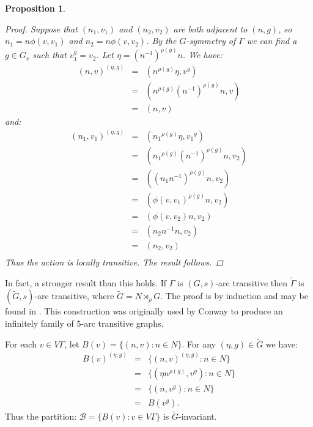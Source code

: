 \documentclass[12pt]{amsart}
\theoremstyle{plain}
\newtheorem{proposition}{Proposition}
\theoremstyle{definition}
\theoremstyle{remark}
\newcommand{\cB}{\mathcal{B}}
\begin{document}
\begin{proposition}
\begin{proof}
\hfill \break
Suppose that $(n_1,v_1)$ and $(n_2,v_2)$ are both adjacent to $(n,g)$,
so $n_1 = n \phi(v,v_1)$ and $n_2 = n \phi(v,v_2)$.
By the $G$-symmetry of $\Gamma$ we can find a $g \in G_v$ such that
$v_1^g = v_2$.
Let $\eta = (n^{-1})^{\rho(g)}n$. We have:
\begin{eqnarray*}
(n,v)^{(\eta,g)} & = & (n^{\rho(g)} \eta, v^g) \\
                 & = & (n^{\rho(g)} (n^{-1})^{\rho(g)}n, v) \\
		 & = & (n,v)
\end{eqnarray*}
and:
\begin{eqnarray*}
(n_1,v_1)^{(\eta,g)} & = & ({n_1}^{\rho(g)} \eta, {v_1}^g) \\
                 & = & ({n_1}^{\rho(g)} (n^{-1})^{\rho(g)}n, v_2) \\
                 & = & ({(n_1 n^{-1})}^{\rho(g)} n, v_2) \\
                 & = & (\phi(v,v_1)^{\rho(g)} n, v_2) \\
                 & = & (\phi(v,v_2) n, v_2) \\
                 & = & (n_2 n^{-1} n, v_2) \\
                 & = & (n_2, v_2) \\
\end{eqnarray*}
Thus the action is locally transitive.
The result follows.

\end{proof}
\end{proposition}

In fact, a stronger result than this holds.
If $\Gamma$ is $(G,s)$-arc transitive
then $\widetilde{\Gamma}$ is $(\widetilde{G},s)$-arc transitive,
where $\widetilde{G} = N \rtimes_\rho G$.
The proof is by induction and may be found in \cite{B1974}.
This construction was originally used by Conway
to produce an infinitely family of $5$-arc transitive graphs.

\hfill \break
For each $v \in V \Gamma$, let $B(v) = \{ (n,v) : n \in N \}$.
For any $(\eta, g) \in \widetilde{G}$ we have:
\begin{eqnarray*}
B(v)^{(\eta,g)} & = & \{ (n,v)^{(\eta,g)} : n \in N \} \\
                & = & \{ (\eta n^{\rho(g)},v^g) : n \in N \} \\
		& = & \{ (n, v^g) : n \in N \} \\
		& = & B(v^g).
\end{eqnarray*}
Thus the partition: 
$\cB = \{ B(v) : v \in V \Gamma \}$
is $\widetilde{G}$-invariant.
\end{document}
